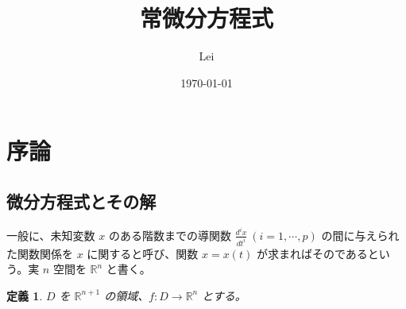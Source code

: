 \documentclass[dvipdfmx, a4paper]{jsarticle}
\title{常微分方程式}
\author{Lei}
\date{\today}
\newcommand{\R}{\mathbb{R}}
\newtheorem{definition}[theorem]{定義}
\begin{document}
\maketitle

\section{序論}

\subsection{微分方程式とその解}

一般に、未知変数 $x$ のある階数までの導関数 $\frac{d^ix}{dt^i}\ (i=1, \cdots, p)$ の間に与えられた関数関係を $x$ に関すると呼び、関数 $x=x(t)$ が求まればそのであるという。実 $n$ 空間を $\R^n$ と書く。

\begin{definition}
    $D$ を $\R^{n+1}$ の領域、$f: D\to \R^n$ とする。
\end{definition}
\end{document}
